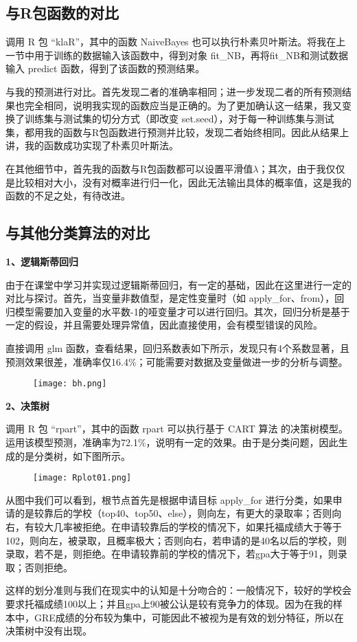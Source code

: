 \documentclass[UTF8,cs4size]{ctexart}
\begin{document}
\subsection{\heiti 与R包函数的对比}
\par 调用 R 包 “klaR”，其中的函数 NaiveBayes 也可以执行朴素贝叶斯法。将我在上一节中用于训练的数据输入该函数中，得到对象 fit\_NB，再将fit\_NB和测试数据输入 predict 函数，得到了该函数的预测结果。
\par 与我的预测进行对比。首先发现二者的准确率相同；进一步发现二者的所有预测结果也完全相同，说明我实现的函数应当是正确的。为了更加确认这一结果，我又变换了训练集与测试集的切分方式（即改变 set.seed），对于每一种训练集与测试集，都用我的函数与R包函数进行预测并比较，发现二者始终相同。因此从结果上讲，我的函数成功实现了朴素贝叶斯法。
\par 在其他细节中，首先我的函数与R包函数都可以设置平滑值$\lambda$；其次，由于我仅仅是比较相对大小，没有对概率进行归一化，因此无法输出具体的概率值，这是我的函数的不足之处，有待改进。


\subsection{\heiti 与其他分类算法的对比}
\noindent \textbf{1、逻辑斯蒂回归}
\par 由于在课堂中学习并实现过逻辑斯蒂回归，有一定的基础，因此在这里进行一定的对比与探讨。首先，当变量非数值型，是定性变量时（如 apply\_for、from），回归模型需要加入变量的水平数-1的哑变量才可以进行回归。其次，回归分析是基于一定的假设，并且需要处理异常值，因此直接使用，会有模型错误的风险。
\par 直接调用 glm 函数，查看结果，回归系数表如下所示，发现只有4个系数显著，且预测效果很差，准确率仅16.4\%；可能需要对数据及变量做进一步的分析与调整。

\begin{figure}[H]
	\centering
	\texttt{[image: bh.png]}
\end{figure}

\noindent \textbf{2、决策树}
\par 调用 R 包 “rpart”，其中的函数 rpart 可以执行基于 CART 算法 的决策树模型。运用该模型预测，准确率为72.1\%，说明有一定的效果。由于是分类问题，因此生成的是分类树，如下图所示。

\begin{figure}[h]
	\centering
	\texttt{[image: Rplot01.png]}
\end{figure}

\par 从图中我们可以看到，根节点首先是根据申请目标 apply\_for 进行分类，如果申请的是较靠后的学校（top40、top50、else），则向左，有更大的录取率；否则向右，有较大几率被拒绝。在申请较靠后的学校的情况下，如果托福成绩大于等于102，则向左，被录取，且概率极大；否则向右，若申请的是40名以后的学校，则录取，若不是，则拒绝。在申请较靠前的学校的情况下，若gpa大于等于91，则录取；否则拒绝。
\par 这样的划分准则与我们在现实中的认知是十分吻合的：一般情况下，较好的学校会要求托福成绩100以上；并且gpa上90被公认是较有竞争力的体现。因为在我的样本中，GRE成绩的分布较为集中，可能因此不被视为是有效的划分特征，所以在决策树中没有出现。
\end{document}
